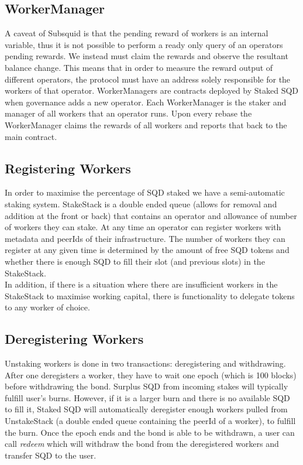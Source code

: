 \documentclass{article}
\begin{document}
\subsection{WorkerManager}
A caveat of Subsquid is that the pending reward of workers is an internal variable, thus it is not possible to perform a ready only query of an operators pending rewards. We instead must claim the rewards and observe the resultant balance change. This means that in order to measure the reward output of different operators, the protocol must have an address solely responsible for the workers of that operator. WorkerManagers are contracts deployed by Staked SQD when governance adds a new operator. Each WorkerManager is the staker and manager of all workers that an operator runs. Upon every rebase the WorkerManager claims the rewards of all workers and reports that back to the main contract.
\subsection{Registering Workers}
In order to maximise the percentage of SQD staked we have a semi-automatic staking system. StakeStack is a double ended queue (allows for removal and addition at the front or back) that contains an operator and allowance of number of workers they can stake. At any time an operator can register workers with metadata and peerIds of their infrastructure. The number of workers they can register at any given time is determined by the amount of free SQD tokens and whether there is enough SQD to fill their slot (and previous slots) in the StakeStack.
\\
In addition, if there is a situation where there are insufficient workers in the StakeStack to maximise working capital, there is functionality to delegate tokens to any worker of choice.
\subsection{Deregistering Workers}
Unstaking workers is done in two transactions: deregistering and withdrawing. After one deregisters a worker, they have to wait one epoch (which is 100 blocks) before withdrawing the bond. Surplus SQD from incoming stakes will typically fulfill user's burns. However, if it is a larger burn and there is no available SQD to fill it, Staked SQD will automatically deregister enough workers pulled from UnstakeStack (a double ended queue containing the peerId of a worker), to fulfill the burn. Once the epoch ends and the bond is able to be withdrawn, a user can call \textit{redeem} which will withdraw the bond from the deregistered workers and transfer SQD to the user.
\end{document}
